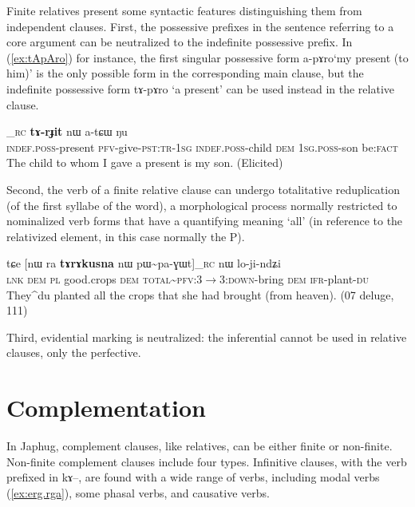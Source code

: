 \documentclass[oldfontcommands,oneside,a4paper,11pt]{article}
\newcommand{\ipa}[1]{{\phon#1}} %
\newcommand{\topic}{\textsc{dem}}
\newcommand{\refb}[1]{(\ref{#1})}
\newcommand{\factual}[1]{\textsc{:fact}}
\begin{document}
Finite relatives present some syntactic features distinguishing them from independent clauses. First, the possessive prefixes in the sentence referring to a core argument can be neutralized to the indefinite possessive prefix. In \refb{ex:tApAro} for instance, the first singular possessive form \ipa{a-pɤro}`my present (to him)' is the only possible form in the corresponding main clause, but the indefinite possessive form \ipa{tɤ-pɤro} `a present' can be used instead in the relative clause.

		\begin{exe}
\ex \label{ex:tApAro}
\gll
	[\ipa{tɤ-pɤro}  	\ipa{nɯ-mbi-t-a}]_{\textsc{rc}}  	\ipa{\textbf{tɤ-rɟit}}  	\ipa{nɯ}  	\ipa{a-tɕɯ}  	\ipa{ŋu}   \\
	\textsc{indef.poss}-present \textsc{pfv}-give-\textsc{pst:tr-1sg} 	\textsc{indef.poss}-child \topic{} \textsc{1sg.poss}-son be\factual{} \\
\glt The child to whom I gave a present is my son. (Elicited)
 	  \end{exe} 
 	  
Second, the verb of a finite relative clause can undergo totalitative reduplication (of the first syllabe of the word), a morphological process normally restricted to nominalized verb forms that have a quantifying meaning `all' (in reference to the relativized element, in this case normally the P).

  \begin{exe}
\ex \label{ex:pWpaGWt}
\gll
\ipa{tɕe}  	[\ipa{nɯ} \ipa{ra}  	\ipa{\textbf{tɤrɤkusna}} 	\ipa{nɯ}  	\ipa{pɯ\textasciitilde{}pa-ɣɯt}]_{\textsc{rc}}  	\ipa{nɯ}  	\ipa{lo-ji-ndʑi}  \\
\textsc{lnk} \textsc{dem} \textsc{pl} good.crops \topic{} \textsc{total\textasciitilde{}pfv:3$\rightarrow$3:down}-bring \topic{} \textsc{ifr}-plant-\textsc{du} \\
\glt They^{du} planted all the crops that she had brought (from heaven). (07 deluge, 111)
\end{exe}

Third, evidential marking is neutralized: the inferential cannot be used in relative clauses, only the perfective.
 
\section{Complementation}
In Japhug, complement clauses, like relatives, can be either finite or non-finite. Non-finite complement clauses include four types. Infinitive clauses, with the verb prefixed in \ipa{kɤ--}, are found with a wide range of verbs, including modal verbs (\ref{ex:erg.rga}), some phasal verbs, and causative verbs. 
\end{document}
